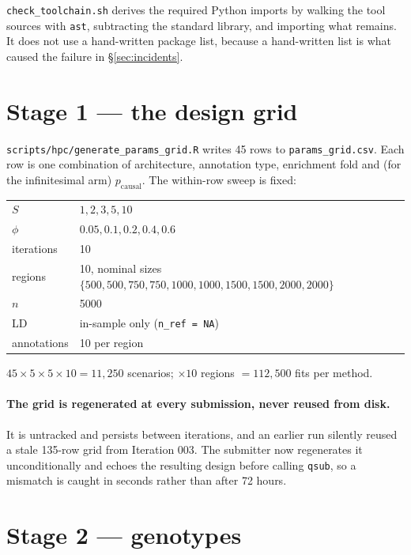 \documentclass[11pt,a4paper]{article}
\newcommand{\file}[1]{\texttt{\small #1}}
\begin{document}
\file{check\_toolchain.sh} derives the required Python imports by walking the
tool sources with \texttt{ast}, subtracting the standard library, and importing
what remains. It does not use a hand-written package list, because a
hand-written list is what caused the failure in \S\ref{sec:incidents}.

\section{Stage 1 --- the design grid}

\file{scripts/hpc/generate\_params\_grid.R} writes 45 rows to
\file{params\_grid.csv}. Each row is one combination of architecture,
annotation type, enrichment fold and (for the infinitesimal arm)
$p_{\text{causal}}$. The within-row sweep is fixed:

\begin{center}\small
\begin{tabular}{ll}\toprule
$S$ & $1,2,3,5,10$\\
$\phi$ & $0.05, 0.1, 0.2, 0.4, 0.6$\\
iterations & 10\\
regions & 10, nominal sizes $\{500,500,750,750,1000,1000,1500,1500,2000,2000\}$\\
$n$ & 5000\\
LD & in-sample only (\texttt{n\_ref = NA})\\
annotations & 10 per region\\
\bottomrule\end{tabular}\end{center}

$45\times5\times5\times10 = 11{,}250$ scenarios; $\times10$ regions
$=112{,}500$ fits per method.

\paragraph{The grid is regenerated at every submission, never reused from disk.}
It is untracked and persists between iterations, and an earlier run silently
reused a stale 135-row grid from Iteration 003. The submitter now regenerates it
unconditionally and echoes the resulting design before calling \texttt{qsub}, so
a mismatch is caught in seconds rather than after 72 hours.

\section{Stage 2 --- genotypes}
\end{document}
